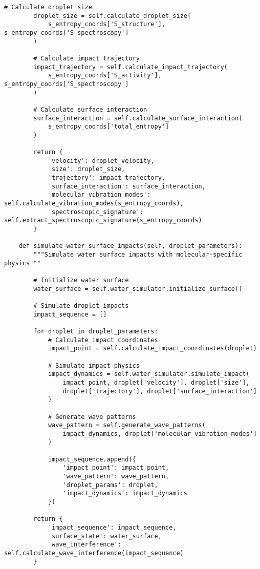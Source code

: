 \documentclass[12pt,a4paper]{article}
\begin{document}
\begin{lstlisting}[style=pythonstyle, caption=Core Molecular-to-Computer Vision Transformation Implementation]
        # Calculate droplet size
        droplet_size = self.calculate_droplet_size(
            s_entropy_coords['S_structure'], s_entropy_coords['S_spectroscopy']
        )

        # Calculate impact trajectory
        impact_trajectory = self.calculate_impact_trajectory(
            s_entropy_coords['S_activity'], s_entropy_coords['S_spectroscopy']
        )

        # Calculate surface interaction
        surface_interaction = self.calculate_surface_interaction(
            s_entropy_coords['total_entropy']
        )

        return {
            'velocity': droplet_velocity,
            'size': droplet_size,
            'trajectory': impact_trajectory,
            'surface_interaction': surface_interaction,
            'molecular_vibration_modes': self.calculate_vibration_modes(s_entropy_coords),
            'spectroscopic_signature': self.extract_spectroscopic_signature(s_entropy_coords)
        }

    def simulate_water_surface_impacts(self, droplet_parameters):
        """Simulate water surface impacts with molecular-specific physics"""

        # Initialize water surface
        water_surface = self.water_simulator.initialize_surface()

        # Simulate droplet impacts
        impact_sequence = []

        for droplet in droplet_parameters:
            # Calculate impact coordinates
            impact_point = self.calculate_impact_coordinates(droplet)

            # Simulate impact physics
            impact_dynamics = self.water_simulator.simulate_impact(
                impact_point, droplet['velocity'], droplet['size'],
                droplet['trajectory'], droplet['surface_interaction']
            )

            # Generate wave patterns
            wave_pattern = self.generate_wave_patterns(
                impact_dynamics, droplet['molecular_vibration_modes']
            )

            impact_sequence.append({
                'impact_point': impact_point,
                'wave_pattern': wave_pattern,
                'droplet_params': droplet,
                'impact_dynamics': impact_dynamics
            })

        return {
            'impact_sequence': impact_sequence,
            'surface_state': water_surface,
            'wave_interference': self.calculate_wave_interference(impact_sequence)
        }
\end{lstlisting}
\end{document}
